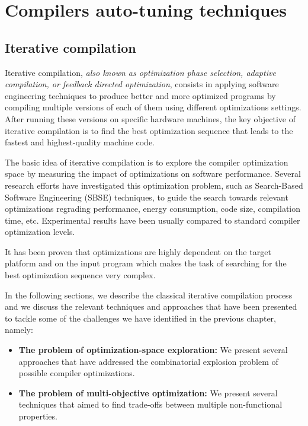 \section{Compilers auto-tuning techniques}
\label{sec:Compilers auto-tuning techniques}

\subsection{Iterative compilation}
Iterative compilation, \textit{also known as optimization phase selection, adaptive compilation, or feedback directed optimization}\cite{triantafyllis2003compiler}, consists in applying software engineering techniques to produce better and more optimized programs by compiling multiple versions of each of them using different optimizations settings. After running these versions on specific hardware machines, the key objective of iterative compilation is to find the best optimization sequence that leads to the fastest and highest-quality machine code. 

The basic idea of iterative compilation is to explore the compiler optimization space by measuring the impact of optimizations on software performance.
Several research efforts have investigated this optimization problem, such as Search-Based Software Engineering (SBSE) techniques, to guide the search towards relevant optimizations regrading performance, energy consumption, code size, compilation time, etc. Experimental results have been usually compared to standard compiler optimization levels.  

It has been proven that optimizations are highly dependent on the target platform and on the input program which makes the task of searching for the best optimization sequence very complex\cite{triantafyllis2003compiler}.

In the following sections, we describe the classical iterative compilation process and we discuss the relevant techniques and approaches that have been presented to tackle some of the challenges  we have identified in the previous chapter,  namely:
\begin{itemize}
	\item \textbf{The problem of optimization-space exploration:} We present several approaches that have addressed the combinatorial explosion problem of possible compiler optimizations.
	
	\item \textbf{The problem of multi-objective optimization:} We present several techniques that aimed to find trade-offs between multiple non-functional properties.
		
\end{itemize}

